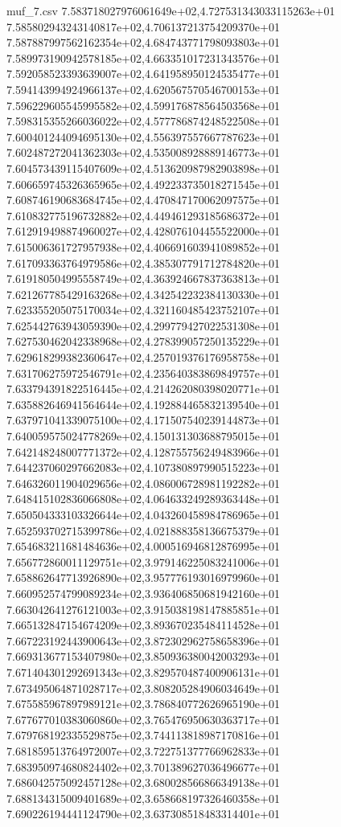 \begin{filecontents*}{muf_7.csv}
7.583718027976061649e+02,4.727531343033115263e+01
7.585802943243140817e+02,4.706137213754209370e+01
7.587887997562162354e+02,4.684743771798093803e+01
7.589973190942578185e+02,4.663351017231343576e+01
7.592058523393639007e+02,4.641958950124535477e+01
7.594143994924966137e+02,4.620567570546700153e+01
7.596229605545995582e+02,4.599176878564503568e+01
7.598315355266036022e+02,4.577786874248522508e+01
7.600401244094695130e+02,4.556397557667787623e+01
7.602487272041362303e+02,4.535008928889146773e+01
7.604573439115407609e+02,4.513620987982903898e+01
7.606659745326365965e+02,4.492233735018271545e+01
7.608746190683684745e+02,4.470847170062097575e+01
7.610832775196732882e+02,4.449461293185686372e+01
7.612919498874960027e+02,4.428076104455522000e+01
7.615006361727957938e+02,4.406691603941089852e+01
7.617093363764979586e+02,4.385307791712784820e+01
7.619180504995558749e+02,4.363924667837363813e+01
7.621267785429163268e+02,4.342542232384130330e+01
7.623355205075170034e+02,4.321160485423752107e+01
7.625442763943059390e+02,4.299779427022531308e+01
7.627530462042338968e+02,4.278399057250135229e+01
7.629618299382360647e+02,4.257019376176958758e+01
7.631706275972546791e+02,4.235640383869849757e+01
7.633794391822516445e+02,4.214262080398020771e+01
7.635882646941564644e+02,4.192884465832139540e+01
7.637971041339075100e+02,4.171507540239144873e+01
7.640059575024778269e+02,4.150131303688795015e+01
7.642148248007771372e+02,4.128755756249483966e+01
7.644237060297662083e+02,4.107380897990515223e+01
7.646326011904029656e+02,4.086006728981192282e+01
7.648415102836066808e+02,4.064633249289363448e+01
7.650504333103326644e+02,4.043260458984786965e+01
7.652593702715399786e+02,4.021888358136675379e+01
7.654683211681484636e+02,4.000516946812876995e+01
7.656772860011129751e+02,3.979146225083241006e+01
7.658862647713926890e+02,3.957776193016979960e+01
7.660952574799089234e+02,3.936406850681942160e+01
7.663042641276121003e+02,3.915038198147885851e+01
7.665132847154674209e+02,3.893670235484114528e+01
7.667223192443900643e+02,3.872302962758658396e+01
7.669313677153407980e+02,3.850936380042003293e+01
7.671404301292691343e+02,3.829570487400906131e+01
7.673495064871028717e+02,3.808205284906034649e+01
7.675585967897989121e+02,3.786840772626965190e+01
7.677677010383060860e+02,3.765476950630363717e+01
7.679768192335529875e+02,3.744113818987170816e+01
7.681859513764972007e+02,3.722751377766962833e+01
7.683950974680824402e+02,3.701389627036496677e+01
7.686042575092457128e+02,3.680028566866349138e+01
7.688134315009401689e+02,3.658668197326460358e+01
7.690226194441124790e+02,3.637308518483314401e+01

\end{filecontents*}

